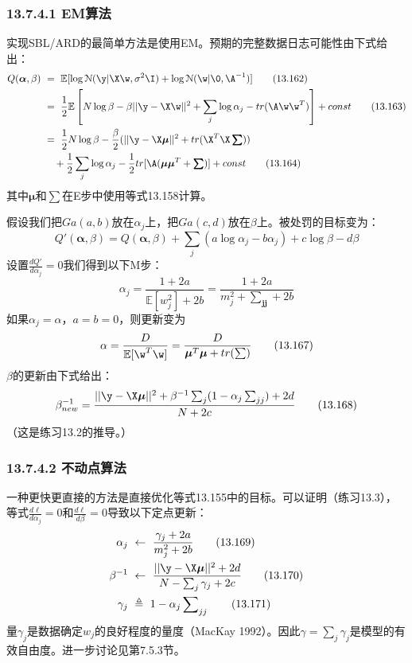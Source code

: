 \documentclass[a4paper]{article}
\begin{document}
\subsubsection*{13.7.4.1  EM算法}
实现SBL/ARD的最简单方法是使用EM。预期的完整数据日志可能性由下式给出：
\begin{align}
	Q(\boldsymbol{\alpha},\beta)\ &=\ \mathbb{E}[\log \mathcal{N}(\y|\X\w,\sigma^2\I)+\log \mathcal{N}(\w|\0,\A^{-1})]\tag{13.162}\\
	&=\ \frac{1}{2}\mathbb{E}\left[N\log \beta -\beta ||\y-\X\w||^2+\sum_j\log \alpha_j-tr(\A\w\w^T)\right]+const\tag{13.163}\\
	&=\ \frac{1}{2}N\log \beta -\frac{\beta}{2}(||\y-\X\boldsymbol{\mu}||^2+tr(\X^T\X\boldsymbol{\textstyle\sum}))\tag*{}\\
	&\ \ \ +\frac{1}{2}\sum_j\log \alpha_j-\frac{1}{2}tr[\A (\boldsymbol{\mu}\boldsymbol{\mu}^T+\boldsymbol{\textstyle\sum})]+const\tag{13.164}
\end{align}
其中$\boldsymbol{\mu}$和$\boldsymbol{\textstyle\sum}$在E步中使用等式13.158计算。

假设我们把$Ga(a,b)$放在$\alpha_j$上，把$Ga(c,d)$放在$\beta$上。被处罚的目标变为：
\begin{equation}
	Q'(\boldsymbol{\alpha},\beta)=Q(\boldsymbol{\alpha},\beta)+\sum_j(a\log \alpha_j-b\alpha_j)+c\log \beta-d\beta\tag{13.165}
\end{equation}
设置$\frac{dQ'}{d\alpha_j}=0$我们得到以下M步：
\begin{equation}
	\alpha_j=\dfrac{1+2a}{\mathbb{E}[w_j^2]+2b}=\dfrac{1+2a}{m_j^2+\boldsymbol{\textstyle\sum\nolimits_{jj}}+2b}\tag{13.166}
\end{equation}
如果$\alpha_j=\alpha$，$a=b=0$，则更新变为
\begin{equation}
	\alpha=\dfrac{D}{\mathbb{E}[\w^T\w]}=\dfrac{D}{\boldsymbol{\mu}^T\boldsymbol{\mu}+tr(\textstyle\sum)}\tag{13.167}
\end{equation}
$\beta$的更新由下式给出：
\begin{equation}
	\beta_{new}^{-1}=\dfrac{||\y-\X\boldsymbol{\mu}||^2+\beta^{-1}\sum_j(1-\alpha_j\textstyle\sum\nolimits_{jj})+2d}{N+2c}\tag{13.168}
\end{equation}
（这是练习13.2的推导。）

\subsubsection*{13.7.4.2  不动点算法}
一种更快更直接的方法是直接优化等式13.155中的目标。可以证明（练习13.3），等式$\frac{d\ell}{d\alpha_j}=0$和$\frac{d\ell}{d\beta}=0$导致以下定点更新：
\begin{align}
	\alpha_j\ &\gets\ \dfrac{\gamma_j+2a}{m_j^2+2b}\tag{13.169}\\
	\beta^{-1}\ &\gets\ \dfrac{||\y-\X\boldsymbol{\mu}||^2+2d}{N-\sum\nolimits_{j}\gamma_j+2c}\tag{13.170}\\
	\gamma_j\ &\triangleq\ 1-\alpha_j\sum\nolimits_{jj}\tag{13.171}
\end{align}
量$\gamma_j$是数据确定$w_j$的良好程度的量度（MacKay 1992）。因此$\gamma=\sum\nolimits_{j}\gamma_j$是模型的有效自由度。进一步讨论见第7.5.3节。
\end{document}
